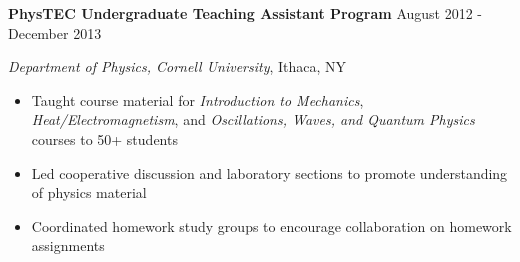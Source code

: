 

\vspace{7pt}

\textbf{PhysTEC Undergraduate Teaching Assistant Program} \hfill August 2012 - December 2013

\textit{Department of Physics, Cornell University}, Ithaca, NY

\begin{itemize}
    \item Taught course material for \textit{Introduction to Mechanics}, \textit{Heat/Electromagnetism}, and \textit{Oscillations, Waves, \newline and Quantum Physics} courses to 50+ students
    \item Led cooperative discussion and laboratory sections to promote understanding of physics material
    \item Coordinated homework study groups to encourage collaboration on homework assignments
\end{itemize}
